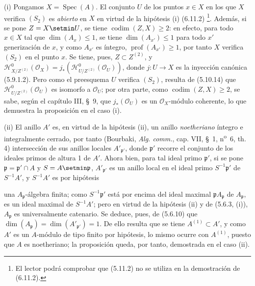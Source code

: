 (i) Pongamos $X=\operatorname{Spec}(A)$. El conjunto $U$ de los puntos
$x\in X$ en los que $X$ verifica $(S_2)$ es \emph{abierto} en $X$ en virtud de la
hipótesis (i) (6.11.2)
\footnote{El lector podrá comprobar que (5.11.2) no se utiliza en la
demostración de (6.11.2).}. Además, si se pone $Z=X\setmin U$, se tiene
$\operatorname{codim}(Z,X)\geq2$: en efecto, para todo $x\in X$ tal que
$\dim(A_x)\leq1$, se tiene $\dim(A_{x'})\leq1$ para todo $x'$ generización de
$x$, y como $A_{x'}$ es íntegro, $\operatorname{prof}(A_{x'})\geq1$, por tanto
$X$ verifica $(S_2)$ en el punto $x$. Se tiene, pues, $Z\subset Z^{(2)}$, y
$\mathcal H^0_{X/Z^{(2)}}(\mathcal O_X)
=j_*(\mathcal H^0_{U/Z^{(2)}}(\mathcal O_U))$, donde $j:U\to X$ es la
inyección canónica (5.9.1.2). Pero como el preesquema $U$ verifica $(S_2)$,
resulta de (5.10.14) que
$\mathcal H^0_{U/Z^{(2)}}(\mathcal O_U)$ es isomorfo a $\mathcal O_U$; por
otra parte, como $\operatorname{codim}(Z,X)\geq2$, se sabe, según el capítulo
III, \S~9, que $j_*(\mathcal O_U)$ es un $\mathcal O_X$-módulo coherente, lo
que demuestra la proposición en el caso (i).

(ii) El anillo $A'$ es, en virtud de la hipótesis (ii), un anillo \emph{noetheriano}
íntegro e integralmente cerrado, por tanto (Bourbaki, \emph{Alg. comm.}, cap.
VII, \S~1, n\textsuperscript{o}~6, th. 4) intersección de sus anillos locales
$A'_{\mathfrak p'}$, donde $\mathfrak p'$ recorre el conjunto de los ideales
primos de altura 1 de $A'$. Ahora bien, para tal ideal primo $\mathfrak p'$,
si se pone $\mathfrak p=\mathfrak p'\cap A$ y $S=A\setmin\mathfrak p$,
$A'_{\mathfrak p'}$ es un anillo local en el ideal primo
$S^{-1}\mathfrak p'$ de $S^{-1}A'$, y $S^{-1}A'$ es por hipótesis


una $A_\mathfrak p$-álgebra finita; como $S^{-1}\mathfrak p'$ está por encima
del ideal maximal $\mathfrak pA_\mathfrak p$ de $A_\mathfrak p$, es un ideal
maximal de $S^{-1}A'$; pero en virtud de la hipótesis (ii) y de (5.6.3, (i)),
$A_\mathfrak p$ es universalmente catenario. Se deduce, pues, de (5.6.10) que
$\dim(A_\mathfrak p)=\dim(A'_{\mathfrak p'})=1$. De ello resulta que se tiene
$A^{(1)}\subset A'$, y como $A'$ es un $A$-módulo de tipo finito por hipótesis,
lo mismo ocurre con $A^{(1)}$, puesto que $A$ es noetheriano; la proposición
queda, por tanto, demostrada en el caso (ii).

